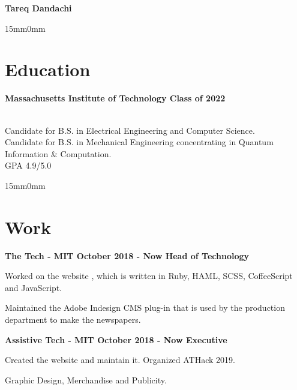 \documentclass[12pt]{article}
\newcommand{\beginTheSection}[1]{
    \begin{adjustwidth}{15mm}{0mm}
    \section{\textcolor{main-color}{#1}}
}
\newcommand{\endTheSection}[0]{\end{adjustwidth}}
\newcommand{\linkToSite}[2]{\href{#1}{\color{main-color}{#2}}}%
\newcommand{\itemHeading}[3]{

    \Large
    \bfseries
    #1
    \small
    \normalfont
    \hspace{3 mm} #3
    \vspace{1 mm}
    \newline
    \normalsize
    \bfseries
    #2
    \vspace{2 mm}

    \normalsize
    \normalfont
    
}
\begin{document}

\newcommand{\logoSq}{\texttt{[image: logoSq.png]}}

\huge
\bfseries
\raisebox{-.25\height}{\logoSq}
\textcolor{main-color}{Tareq Dandachi}\
\newline

\normalsize
\normalfont

\beginTheSection{Education}

\itemHeading{Massachusetts Institute of Technology}{Class of 2022}{}\\

Candidate for B.S. in Electrical Engineering and Computer Science. \\
Candidate for B.S. in Mechanical Engineering concentrating in Quantum Information & Computation. \\
GPA 4.9/5.0\\

\endTheSection

\beginTheSection{Work}

\itemHeading{The Tech - MIT}{Head of Technology}{October 2018 - Now}

Worked on the website \linkToSite{https://thetech.com}{thetech.com}, which is written in Ruby, HAML, SCSS, CoffeeScript and JavaScript.

Maintained the Adobe Indesign CMS plug-in that is used by the production department to make the newspapers.

\itemHeading{Assistive Tech - MIT}{Executive}{October 2018 - Now}

Created the website \linkToSite{assistivetech.mit.com}{assistivetech.mit.com} and maintain it.
Organized ATHack 2019.

Graphic Design, Merchandise and Publicity.

\endTheSection
\end{document}
